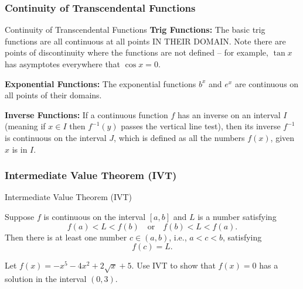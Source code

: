 \documentclass[cal1spr16Lectures.tex]{subfiles}
\begin{document}
\subsubsection{Continuity of Transcendental Functions}

\begin{frame}{\small Continuity of Transcendental Functions}
\footnotesize
{\bf Trig Functions:} The basic trig functions are all continuous at all points \alert{IN THEIR DOMAIN}.  Note there are points of discontinuity where the functions are not defined -- for example, $\tan x$ has asymptotes everywhere that $\cos x=0$.  

\vspace{1pc}
{\bf Exponential Functions:}  The exponential functions $b^x$ and $e^x$ are continuous on all points of their domains.

\vspace{1pc}
{\bf Inverse Functions:}  If a continuous function $f$ has an inverse on an interval $I$ (meaning if $x\in I$ then $f^{-1}(y)$ passes the vertical line test), then its inverse $f^{-1}$ is continuous on the interval $J$, which is defined as all the numbers $f(x)$, given $x$ is in $I$.
\end{frame}

\subsubsection{Intermediate Value Theorem (IVT)}

\begin{frame}{\small Intermediate Value Theorem (IVT)}
\begin{thm} Suppose \alert{$f$ is continuous on the interval $[a,b]$} and $L$ is a number satisfying
\[f(a)<L<f(b)\quad\text{or}\quad f(b)<L<f(a).\]  
Then there is at least one number $c\in (a,b)$, i.e., $a<c<b$, satisfying 
\[f(c)=L.\] 
\end{thm}
\end{frame}

\begin{frame}
\begin{ex} Let $f(x)=-x^5-4x^2+2\sqrt{x}+5.$  Use IVT to show that $f(x)=0$ has a solution in the interval $(0,3)$. \end{ex}
\end{frame}
\end{document}
